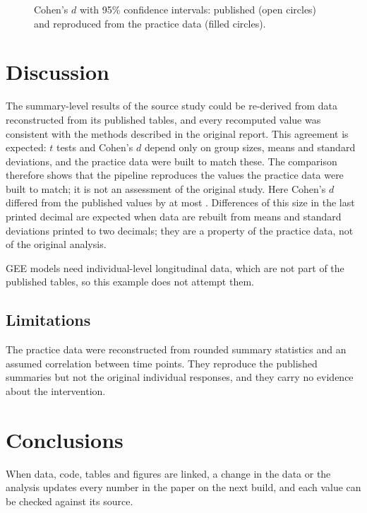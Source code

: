 \documentclass[pdflatex,sn-vancouver-num,referee,lineno]{sn-jnl}
\begin{document}
\begin{figure}[tbp]
\centering

\caption{Cohen's $d$ with 95\% confidence intervals: published (open circles) and reproduced from the practice data (filled circles).}
\label{fig:effects}
\end{figure}

\section{Discussion}
The summary-level results of the source study could be re-derived from data reconstructed from its published tables, and every recomputed value was consistent with the methods described in the original report. This agreement is expected: $t$ tests and Cohen's $d$ depend only on group sizes, means and standard deviations, and the practice data were built to match these. The comparison therefore shows that the pipeline reproduces the values the practice data were built to match; it is not an assessment of the original study. Here Cohen's $d$ differed from the published values by at most \DMaxDiff{}. Differences of this size in the last printed decimal are expected when data are rebuilt from means and standard deviations printed to two decimals; they are a property of the practice data, not of the original analysis.

GEE models need individual-level longitudinal data, which are not part of the published tables, so this example does not attempt them.

\subsection{Limitations}
The practice data were reconstructed from rounded summary statistics and an assumed correlation between time points. They reproduce the published summaries but not the original individual responses, and they carry no evidence about the intervention.

\section{Conclusions}
When data, code, tables and figures are linked, a change in the data or the analysis updates every number in the paper on the next build, and each value can be checked against its source.

\backmatter
\end{document}
